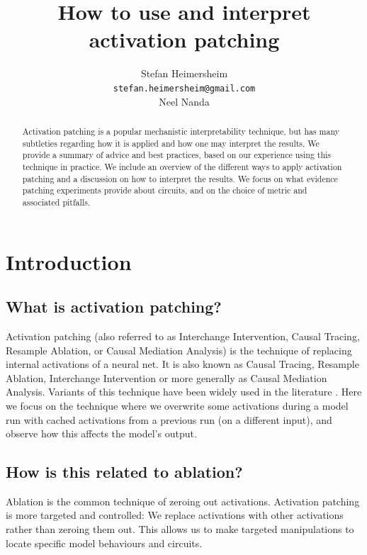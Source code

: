 \documentclass[nonatbib]{article}
\title{How to use and interpret activation patching}
\author{%
  Stefan Heimersheim \\
  \texttt{stefan.heimersheim@gmail.com} \\
  \And
  Neel Nanda \\
}
\begin{document}
\maketitle

\begin{abstract}
  Activation patching is a popular mechanistic interpretability technique, but has many subtleties regarding how it is applied and how one may interpret the results. We provide a summary of advice and best practices, based on our experience using this technique in practice. We include an overview of the different ways to apply activation patching and a discussion on how to interpret the results. We focus on what evidence patching experiments provide about circuits, and on the choice of metric and associated pitfalls.
\end{abstract}

\section{Introduction}
\subsection{What is activation patching?}
Activation patching (also referred to as Interchange Intervention, Causal Tracing, Resample Ablation, or Causal Mediation Analysis) is the technique of replacing internal activations of a neural net. 
It is also known as Causal Tracing, Resample Ablation, Interchange Intervention or more generally as Causal Mediation Analysis. Variants of this technique have been widely used in the literature \citep{2020arXiv200412265V,2021arXiv210602997G,2020arXiv200414623G,2019arXiv191009113S,2021arXiv210606087F,2021arXiv211200826G,ROME,IOI,causal_scrubbing,2023arXiv230104213H,2023arXiv230500586H,ACDC,2023arXiv231015213T,2023arXiv231015916H,2023arXiv231017191F,LieberumChincilla,2023arXiv230908600C,2023arXiv230515054S,NixPathPatching,CallumCopySuppression,2023arXiv230414767G,2023arXiv230910312H,2023arXiv231008744M,2023arXiv231015154T,}. Here we focus on the technique where we overwrite some activations during a model run with cached activations from a previous run (on a different input), and observe how this affects the model’s output.

\subsection{How is this related to ablation?}
Ablation is the common technique of zeroing out activations. Activation patching is more targeted and controlled: We replace activations with other activations rather than zeroing them out. This allows us to make targeted manipulations to locate specific model behaviours and circuits.
\end{document}
